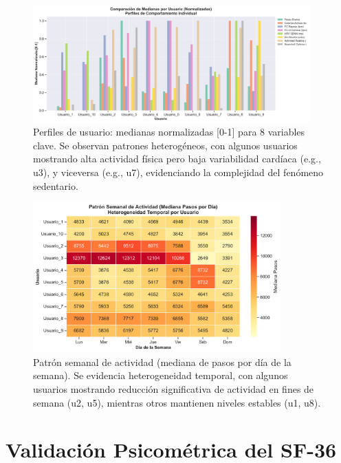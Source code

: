 \documentclass[12pt,letterpaper,twoside]{report}
\begin{document}
\begin{figure}[htbp]
\centering
\includegraphics[width=0.95\textwidth]{../analisis_u/descriptivos_visuales/grouped_bar_medianas_por_usuario.png}
\caption{Perfiles de usuario: medianas normalizadas [0-1] para 8 variables clave. Se observan patrones heterogéneos, con algunos usuarios mostrando alta actividad física pero baja variabilidad cardíaca (e.g., u3), y viceversa (e.g., u7), evidenciando la complejidad del fenómeno sedentario.}
\label{fig:grouped_bar_medianas}
\end{figure}

\begin{figure}[htbp]
\centering
\includegraphics[width=0.85\textwidth]{../analisis_u/descriptivos_visuales/heatmap_patron_semanal.png}
\caption{Patrón semanal de actividad (mediana de pasos por día de la semana). Se evidencia heterogeneidad temporal, con algunos usuarios mostrando reducción significativa de actividad en fines de semana (u2, u5), mientras otros mantienen niveles estables (u1, u8).}
\label{fig:heatmap_semanal}
\end{figure}

\section{Validación Psicométrica del SF-36}
\end{document}
